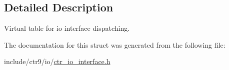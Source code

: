 \subsection{Detailed Description}
Virtual table for io interface dispatching. 

The documentation for this struct was generated from the following file\+:\begin{DoxyCompactItemize}
\item 
include/ctr9/io/\hyperlink{ctr__io__interface_8h}{ctr\+\_\+io\+\_\+interface.\+h}\end{DoxyCompactItemize}
